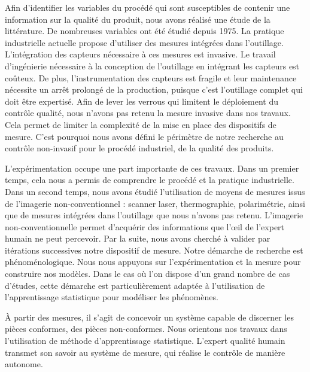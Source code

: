 Afin d'identifier les variables du procédé qui sont susceptibles de contenir une information sur la qualité du produit, nous avons réalisé une étude de la littérature.
De nombreuses variables ont été étudié depuis 1975.
La pratique industrielle actuelle propose d'utiliser des mesures intégrées dans l'outillage.
L'intégration des capteurs nécessaire à ces mesures est invasive.
Le travail d'ingénierie nécessaire à la conception de l'outillage en intégrant les capteurs est coûteux.
De plus, l'instrumentation des capteurs est fragile et leur maintenance nécessite un arrêt prolongé de la production, puisque c'est l'outillage complet qui doit être expertisé.
Afin de lever les verrous qui limitent le déploiement du contrôle qualité, nous n'avons pas retenu la mesure invasive dans nos travaux.
Cela permet de limiter la complexité de la mise en place des dispositifs de mesure.
C'est pourquoi nous avons défini le périmètre de notre recherche au contrôle non-invasif pour le procédé industriel, de la qualité des produits.

L'expérimentation occupe une part importante de ces travaux.
Dans un premier temps, cela nous a permis de comprendre le procédé et la pratique industrielle.
Dans un second temps, nous avons étudié l'utilisation de moyens de mesures issus de l'imagerie non-conventionnel : scanner laser, thermographie, polarimétrie, ainsi que de mesures intégrées dans l'outillage que nous n'avons pas retenu.
L'imagerie non-conventionnelle permet d'acquérir des informations que l'œil de l'expert humain ne peut percevoir.
Par la suite, nous avons cherché à valider par itérations successives notre dispositif de mesure.
Notre démarche de recherche est phénoménologique.
Nous nous appuyons sur l'expérimentation et la mesure pour construire nos modèles.  %
Dans le cas où l'on dispose d'un grand nombre de cas d'études, cette démarche est particulièrement adaptée à l'utilisation de l'apprentissage statistique pour modéliser les phénomènes.

À partir des mesures, il s'agit de concevoir un système capable de discerner les pièces conformes, des pièces non-conformes.
Nous orientons nos travaux dans l'utilisation de méthode d'apprentissage statistique.
L'expert qualité humain transmet son savoir au système de mesure, qui réalise le contrôle de manière autonome.

